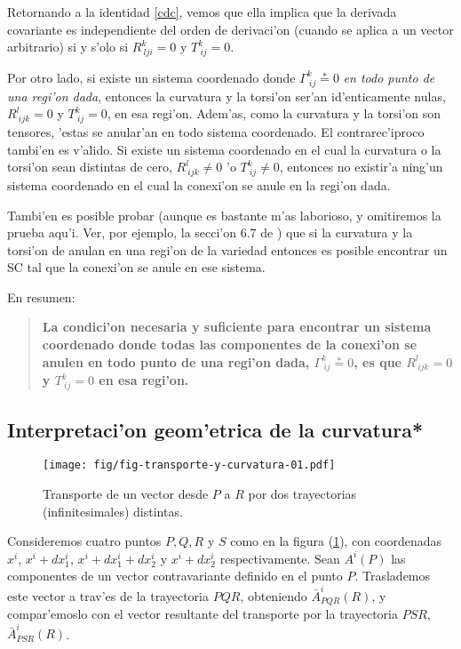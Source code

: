 Retornando a la identidad \eqref{cdc}, vemos que ella implica que la derivada covariante es independiente del orden de derivaci'on (cuando se aplica a un vector arbitrario) si y s'olo si $R_{\ lji}^k=0$ y $T_{\ ij}^{k}=0$.

Por otro lado, si existe un sistema coordenado donde $\Gamma_{\ ij}^k
\overset{\ast}{=}0$ \textit{en todo punto de una regi'on dada}, entonces la curvatura y la torsi'on ser'an id'enticamente nulas, $R_{\ ijk}^l =0$ y $T_{\ ij}^{k}=0$, en esa regi'on. Adem'as, como la curvatura y la torsi'on son tensores, 'estas se anular'an en todo sistema coordenado.
El contrarec'iproco tambi'en es v'alido. Si existe un sistema
coordenado en el cual la curvatura o la torsi'on sean distintas de cero, $R_{\ ijk}^l \neq 0$ 'o $T_{\ ij}^{k}\neq 0$, entonces no existir'a ning'un sistema coordenado en el cual la conexi'on se anule en la regi'on dada.

Tambi'en es posible probar (aunque es bastante m'as laborioso, y omitiremos la prueba aqu'i. Ver, por ejemplo, la secci'on 6.7 de \cite{Dinverno}) que si la curvatura y la torsi'on de anulan en una regi'on de la variedad entonces es posible encontrar un SC tal que la conexi'on se anule en ese sistema.

En resumen:
\begin{quotation}
\textbf{La condici'on necesaria y suficiente para encontrar un sistema coordenado donde todas las componentes de la conexi'on se anulen en todo punto de una regi'on dada, $\Gamma_{\ ij}^k \overset{\ast}{=}0$, es que $R_{\ ijk}^l=0$ y $T_{\ ij}^k =0$ en esa regi'on.}
\end{quotation}

\subsection{Interpretaci'on geom'etrica de la curvatura*}
\begin{center}
\begin{figure}[h!]
\centerline{\texttt{[image: fig/fig-transporte-y-curvatura-01.pdf]}}
\caption{Transporte de un vector desde $P$ a $R$ por dos trayectorias (infinitesimales) distintas.}
\label{intgeomcurv}
\end{figure}
\end{center}

Consideremos cuatro puntos $P,Q,R$ y $S$ como en la figura (\ref{intgeomcurv}), con coordenadas $x^i $, $x^i+dx_1^i$, $x^i+dx_1^i+dx_2^i$ y $x^i+dx_2^i$ respectivamente.
Sean $A^i (P)$ las componentes de un vector contravariante definido en el punto $P$. Traslademos este vector a trav'es de la trayectoria $PQR$, obteniendo $\bar{A}^i_{PQR}(R)$, y compar'emoslo con el vector resultante del transporte por la trayectoria $PSR$, $\bar{A}^i_{PSR}(R)$.

